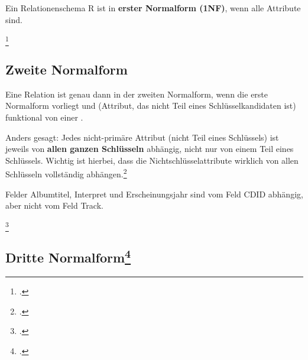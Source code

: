 \documentclass{lehramt-informatik-haupt}
\begin{document}
Ein Relationenschema R ist in \textbf{erster Normalform (1NF)}, wenn
alle Attribute  sind.




\footcite{wiki:normalisierung}

%

\subsection{Zweite Normalform}

Eine Relation ist genau dann in der zweiten Normalform, wenn die erste
Normalform vorliegt und  (Attribut, das
nicht Teil eines Schlüsselkandidaten ist) funktional von einer
.

Anders gesagt: Jedes nicht-primäre Attribut (nicht Teil eines
Schlüssels) ist jeweils von \textbf{allen ganzen Schlüsseln} abhängig,
nicht nur von einem Teil eines Schlüssels. Wichtig ist hierbei, dass die
Nichtschlüsselattribute wirklich von allen Schlüsseln vollständig
abhängen.\footcite[Zweite Normalform (2NF)]{wiki:normalisierung}



Felder Albumtitel, Interpret und Erscheinungsjahr sind vom Feld CDID
abhängig, aber nicht vom Feld Track.



\footcite{wiki:normalisierung}

%

\subsection{Dritte Normalform\footcite[Seite 201]{winter}}
\end{document}
